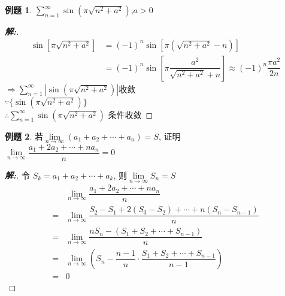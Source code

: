 \documentclass[12pt,a4paper]{ctexart}
\newenvironment{solution}{\begin{proof}[\hspace{2em}\textbf{解:}]}{\end{proof}}
\theoremstyle{definition}%
\newtheorem{exercise}{\hspace{2em}例题}
\begin{document}
\begin{exercise}
	$ \displaystyle\sum_{n=1}^{\infty} \sin\left(\pi\sqrt{n^2+a^2}\right) $,$ a>0 $
\end{exercise}
\begin{solution}
	$$ \begin{aligned}
	\sin\left[\pi\sqrt{n^2+a^2}\right]&=(-1)^n\sin\left[\pi(\sqrt{n^2+a^2}-n)\right] \\
	&=(-1)^n\sin\left[\pi\dfrac{a^2}{\sqrt{n^2+a^2}+n}\right]
	\approx (-1)^n\dfrac{\pi a^2}{2n}
	\end{aligned} $$
	$ \Rightarrow\displaystyle\sum_{n=1}^{\infty} \left|\sin\left(\pi\sqrt{n^2+a^2}\right)\right| $收敛\\
	
	$ \because \{\sin\left(\pi\sqrt{n^2+a^2}\right)\} $\\
	
	$ \therefore\displaystyle\sum_{n=1}^{\infty} \sin\left(\pi\sqrt{n^2+a^2}\right) $ 条件收敛
\end{solution}

\begin{exercise}
	若$ \lim\limits_{n \to \infty}(a_1+a_2+\cdots+a_n)=S $, 证明\\
	
	$ \lim\limits_{n \to \infty}\dfrac{a_1+2a_2+\cdots+na_n}{n}=0 $
\end{exercise}
\begin{solution}
	令 $ S_k=a_1+a_2+\cdots+a_k $, 则$ \lim\limits_{n \to \infty} S_n=S $\\
	\begin{equation*}
	\begin{aligned}
		&\lim\limits_{n \to \infty}\dfrac{a_1+2a_2+\cdots+na_n}{n} \\
		=& \lim\limits_{n \to \infty}\dfrac{S_2-S_1+2(S_3-S_2)+\cdots+n(S_n-S_{n-1})}{n} \\
		=& \lim\limits_{n \to \infty}\dfrac{nS_n-(S_1+S_2+\cdots+S_{n-1})}{n} \\
		=& \lim\limits_{n \to \infty} \left(S_n-\dfrac{n-1}{n}\cdot\dfrac{S_1+S_2+\cdots+S_{n-1}}{n-1}\right)\\
		=& 0
	\end{aligned}
	\end{equation*}
\end{solution}
\end{document}
